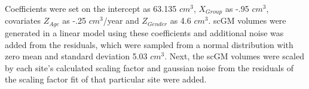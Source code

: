Coefficients were set on the intercept as 63.135 $cm^3$, $X_{Group}$ as -.95 $cm^3$, covariates $Z_{Age}$ as -.25 $cm^3$/year and $Z_{Gender}$ as 4.6 $cm^3$. scGM volumes were generated in a linear model using these coefficients and additional noise was added from the  residuals, which were sampled from a normal distribution with zero mean and standard deviation 5.03 $cm^3$. Next, the scGM volumes were scaled by each site's calculated scaling factor and gaussian noise from the residuals of the scaling factor fit of that particular site were added.